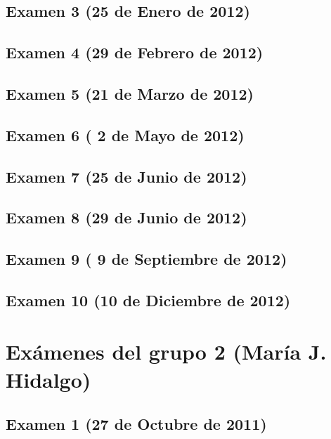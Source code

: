 \documentclass[a4paper,12pt,twoside]{book}
\begin{document}
\subsection{Examen 3 (25 de Enero de 2012)}
\subsection{Examen 4 (29 de Febrero de 2012)}
\subsection{Examen 5 (21 de Marzo de 2012)}
\subsection{Examen 6 ( 2 de Mayo de 2012)}
\subsection{Examen 7 (25 de Junio de 2012)} 
\subsection{Examen 8 (29 de Junio de 2012)} 
\label{examen_11_12_1_8}
\subsection{Examen 9 ( 9 de Septiembre de 2012)} 
\label{examen_11_12_1_9}
\subsection{Examen 10 (10 de Diciembre de 2012)} 
\label{examen_11_12_1_10}

\section{Exámenes del grupo 2 (María J. Hidalgo)}
\subsection{Examen 1 (27 de Octubre de 2011)}
\end{document}
